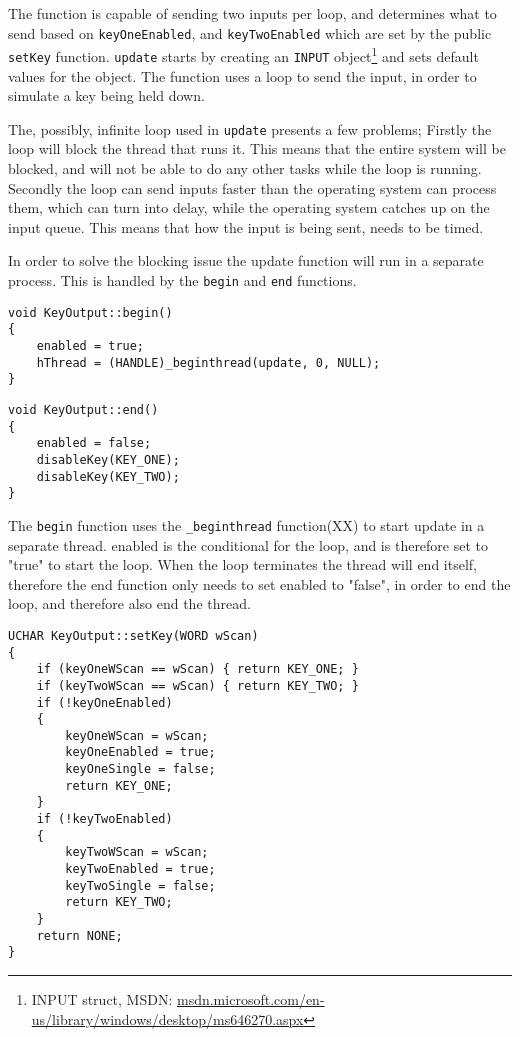 The function is capable of sending two inputs per loop, and determines what to send based on \texttt{keyOneEnabled}, and \texttt{keyTwoEnabled} which are set by the public \texttt{setKey} function. 
\texttt{update} starts by creating an \texttt{INPUT}
object\footnote{INPUT struct, MSDN: \url{msdn.microsoft.com/en-us/library/windows/desktop/ms646270.aspx}} and sets default values for the object. 
The function uses a loop to send the input, in order to simulate a key being held down.
\bigskip

The, possibly, infinite loop used in \texttt{update} presents a few problems;
Firstly the loop will block the thread that runs it. This means that the entire
system will be blocked, and will not be able to do any other tasks while the loop is running. Secondly the
loop can send inputs faster than the operating system can process them, which
can turn into delay, while the operating system catches up on the input queue.
This means that how the input is being sent, needs to be timed.
\bigskip

In order to solve the blocking issue the update function will run in a separate
process. This is handled by the \texttt{begin} and \texttt{end} functions.
\bigskip

\begin{lstlisting}[caption=KeyOutput begin thread function, label=lst:lst12]
void KeyOutput::begin() 
{ 
    enabled = true;
    hThread = (HANDLE)_beginthread(update, 0, NULL);
}
\end{lstlisting}

\begin{lstlisting}[caption=KeyOutput end thread function, label=lst:lst13]
void KeyOutput::end() 
{
    enabled = false;
    disableKey(KEY_ONE);
    disableKey(KEY_TWO);
}
\end{lstlisting}

The \texttt{begin} function uses the \texttt{\_beginthread} function(XX) to
start update in a separate thread. enabled is the conditional for the loop, and
is therefore set to "true" to start the loop. When the loop terminates the thread
will end itself, therefore the end function only needs to set enabled to "false",
in order to end the loop, and therefore also end the thread.

\begin{lstlisting}[caption=KeyOutput setKey function, label=lst:lst14]
UCHAR KeyOutput::setKey(WORD wScan) 
{ 
    if (keyOneWScan == wScan) { return KEY_ONE; } 
    if (keyTwoWScan == wScan) { return KEY_TWO; }
    if (!keyOneEnabled) 
    { 
        keyOneWScan = wScan;
        keyOneEnabled = true;
        keyOneSingle = false;
        return KEY_ONE; 
    } 
    if (!keyTwoEnabled) 
    { 
        keyTwoWScan = wScan; 
        keyTwoEnabled = true; 
        keyTwoSingle = false; 
        return KEY_TWO; 
    } 
    return NONE;  
}
\end{lstlisting}


